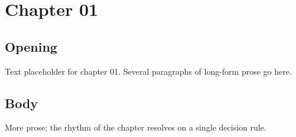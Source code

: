 \chapter{Chapter 01}
\section{Opening}
Text placeholder for chapter 01. Several paragraphs of long-form prose go here.
\section{Body}
More prose; the rhythm of the chapter resolves on a single decision rule.
